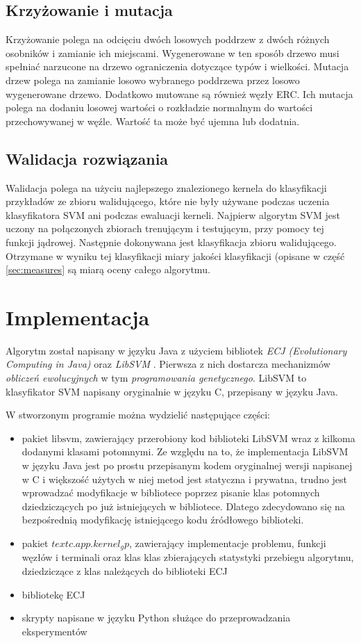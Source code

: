 \subsection{Krzyżowanie i mutacja}
Krzyżowanie polega na odcięciu dwóch losowych poddrzew z dwóch różnych osobników i zamianie ich miejscami. Wygenerowane w ten sposób drzewo musi spełniać narzucone na drzewo ograniczenia dotyczące typów i wielkości.
Mutacja drzew polega na zamianie losowo wybranego poddrzewa przez losowo wygenerowane drzewo.
Dodatkowo mutowane są również węzły ERC. Ich mutacja polega na dodaniu losowej wartości o rozkładzie normalnym do wartości przechowywanej w węźle. Wartość ta może być ujemna lub dodatnia.

\subsection{Walidacja rozwiązania}
Walidacja polega na użyciu najlepszego znalezionego kernela do klasyfikacji przykładów ze zbioru walidującego, które nie były używane podczas uczenia klasyfikatora SVM ani podczas ewaluacji kerneli.
Najpierw algorytm SVM jest uczony na połączonych zbiorach trenującym i testującym, przy pomocy tej funkcji jądrowej. Następnie dokonywana jest klasyfikacja zbioru walidującego. Otrzymane w wyniku tej klasyfikacji miary jakości klasyfikacji (opisane w część \ref{sec:measures} są miarą oceny całego algorytmu.


\section{Implementacja}
Algorytm został napisany w języku Java z użyciem bibliotek \emph{ECJ (Evolutionary Computing in Java)} \cite{sean_ecj_2010} oraz \emph{LibSVM} \cite{chang_libsvm:_2011}. Pierwsza z nich dostarcza mechanizmów \textit{obliczeń ewolucyjnych} w tym \textit{programowania genetycznego}. LibSVM to klasyfikator SVM napisany oryginalnie w języku C, przepisany w języku Java.

W stworzonym programie można wydzielić następujące części:
\begin{itemize}
\item pakiet $ \text{libsvm} $, zawierający przerobiony kod biblioteki LibSVM wraz z kilkoma dodanymi klasami potomnymi. Ze względu na to, że implementacja LibSVM w języku Java jest po prostu przepisanym kodem oryginalnej wersji napisanej w C i większość użytych w niej metod jest statyczna i prywatna, trudno jest wprowadzać modyfikacje w bibliotece poprzez pisanie klas potomnych dziedziczących po już istniejących w bibliotece. Dlatego zdecydowano się na bezpośrednią modyfikację istniejącego kodu źródłowego biblioteki.
\item pakiet $ text{c.app.kernel_gp} $, zawierający implementacje problemu, funkcji węzłów i terminali oraz klas klas zbierających statystyki przebiegu algorytmu, dziedziczące z klas należących do biblioteki ECJ
\item bibliotekę ECJ
\item skrypty napisane w języku Python służące do przeprowadzania eksperymentów
\end{itemize}

